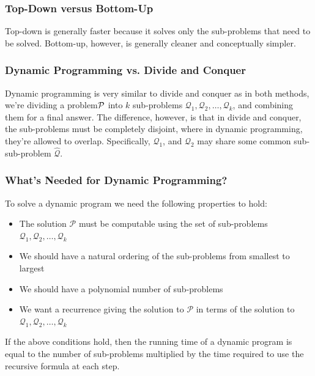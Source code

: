 \documentclass{article}
\newcommand{\mcal}[1]{\mathcal{#1}}
\begin{document}
\subsubsection{Top-Down versus Bottom-Up}
Top-down is generally faster because it solves only the sub-problems that need to be solved. Bottom-up, however, is generally cleaner and conceptually simpler.
\subsubsection{Dynamic Programming vs. Divide and Conquer}
Dynamic programming is very similar to divide and conquer as in both methods, we're dividing a problem$\cal P$ into $k$ sub-problems $\mcal{Q}_1, \mcal{Q}_2, \dots, \mcal{Q}_k$, and combining them for a final answer. The difference, however, is that in divide and conquer, the sub-problems must be completely disjoint, where in dynamic programming, they're allowed to overlap. Specifically, $\mcal{Q}_1$, and $\mcal{Q}_2$ may share some common sub-sub-problem $\hat{\mcal{Q}}$.
\subsubsection{What's Needed for Dynamic Programming?}
To solve a dynamic program we need the following properties to hold:
\begin{itemize}
	\item The solution $\mcal{P}$ must be computable using the set of sub-problems $\mcal{Q}_1, \mcal{Q}_2, \dots, \mcal{Q}_k$
	\item We should have a natural ordering of the sub-problems from smallest to largest
	\item We should have a polynomial number of sub-problems
	\item We want a recurrence giving the solution to $\mcal{P}$ in terms of the solution to $\mcal{Q}_1, \mcal{Q}_2, \dots, \mcal{Q}_k$
\end{itemize}
If the above conditions hold, then the running time of a dynamic program is equal to the number of sub-problems multiplied by the time required to use the recursive formula at each step.
\end{document}
